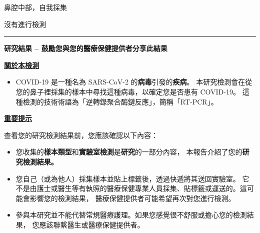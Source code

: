 \documentclass[10pt]{article}
\newcommand{\PageLine}{\rule{\textwidth}{0.25mm}}
\begin{document}
\begin{description}[font=\normalfont,align=left,labelwidth=6em]
\item [\textbf{\VAR{pat_name|e}}]
\item [\textbf{出生日期：}] 
\item [\textbf{標本：}] 鼻腔中部，自我採集
\item [\textbf{採集條碼：}] 
\item [\textbf{採集日期：}] 
\item [\textbf{報告日期：}]
  沒有進行檢測
\end{description}

\PageLine

\begin{center}
\Large
\textbf{研究結果 – 鼓勵您與您的醫療保健提供者分享此結果}
\end{center}

\bigskip

\large \underline{\textbf{關於本檢測}}

\begin{itemize}
\item

  COVID-19 是一種名為 SARS-CoV-2 的\textbf{病毒}引發的\textbf{疾病}。
  本研究檢測會在從您的鼻子裡採集的樣本中尋找這種病毒，以確定您是否患有 COVID-19。
  這種檢測的技術術語為「逆轉錄聚合酶鏈反應」，簡稱「RT-PCR」。

\end{itemize}

\bigskip

\large \underline{\textbf{重要提示}}

查看您的研究檢測結果前，您應該確認以下內容：

\begin{itemize}
\item

  您收集的\textbf{樣本類型}和\textbf{實驗室檢測}是\textbf{研究}的一部分內容，
  本報告介紹了您的\textbf{研究檢測結果。}

\item

  您自己（或為他人）採集樣本並貼上標籤後，透過快遞將其送回實驗室。
  它不是由護士或醫生等有執照的醫療保健專業人員採集、貼標籤或運送的。這可能會影響您的檢測結果，
  醫療保健提供者可能希望再次對您進行檢測。

\item

  參與本研究並不能代替常規醫療護理。如果您感覺很不舒服或擔心您的檢測結果，
  您應該聯繫醫生或醫療保健提供者。

\end{itemize}
\end{document}

